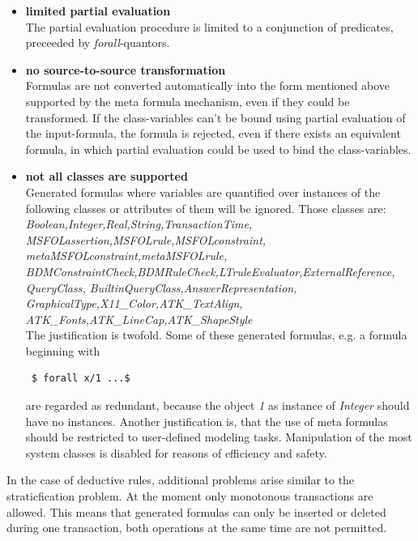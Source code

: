 \begin{itemize}
\item    {\bf limited partial evaluation} \\
    The partial evaluation procedure is limited to a
    conjunction of predicates, preceeded by
    {\em forall}-quantors.
\item    {\bf no source-to-source transformation} \\
    Formulas are not converted automatically into the form mentioned above
    supported by the meta formula mechanism, even if they could be transformed.
    If the class-variables can't be bound using partial evaluation of the
    input-formula, the formula is rejected, even if there exists an equivalent
    formula, in which partial evaluation could be used to bind the class-variables.
\item    {\bf not all classes are supported} \\
    Generated formulas where variables are quantified over
    instances of the following classes or attributes of them
    will be ignored. Those classes are: \\
    {\em Boolean,Integer,Real,String,TransactionTime, \\
        MSFOLassertion,MSFOLrule,MSFOLconstraint, \\
    metaMSFOLconstraint,metaMSFOLrule, \\
        BDMConstraintCheck,BDMRuleCheck,LTruleEvaluator,ExternalReference, \\
        QueryClass, BuiltinQueryClass,AnswerRepresentation, \\
    GraphicalType,X11\_Color,ATK\_TextAlign, \\
        ATK\_Fonts,ATK\_LineCap,ATK\_ShapeStyle} \\
    The justification is twofold. Some of these generated formulas, e.g. a
    formula beginning with
    \begin{verbatim} $ forall x/1 ...$ \end{verbatim}
    are regarded as redundant, because the object {\em 1} as instance
    of {\em Integer} should have no instances.
        Another justification is, that the use of meta formulas should be
    restricted to user-defined modeling tasks. Manipulation of the most system classes
        is disabled for reasons of efficiency and safety.
\end{itemize}

In the case of deductive rules, additional problems arise similar to
the straticfication problem. At the moment only monotonous transactions
are allowed. This means that generated formulas can only be
inserted or deleted during one transaction, both operations
at the same time are not permitted.


